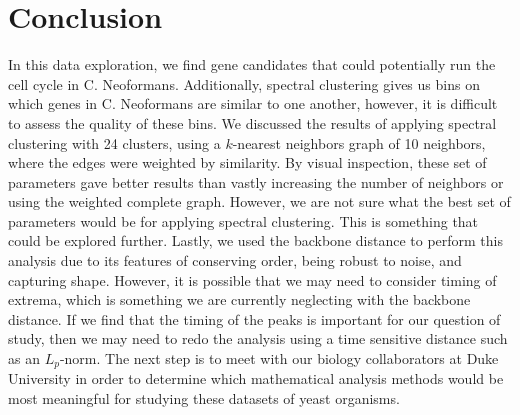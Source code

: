 \section{Conclusion}
In this data exploration, we find gene candidates that could potentially run the cell cycle in C. Neoformans. Additionally, spectral clustering gives us bins on which genes in C. Neoformans are similar to one another, however, it is difficult to assess the quality of these bins. We discussed the results of applying spectral clustering with 24 clusters, using a $k$-nearest neighbors graph of 10 neighbors, where the edges were weighted by similarity. By visual inspection, these set of parameters gave better results than vastly increasing the number of neighbors or using the weighted complete graph. However, we are not sure what the best set of parameters would be for applying spectral clustering. This is something that could be explored further. Lastly, we used the backbone distance to perform this analysis due to its features of conserving order, being robust to noise, and capturing shape. However, it is possible that we may need to consider timing of extrema, which is something we are currently neglecting with the backbone distance. If we find that the timing of the peaks is important for our question of study, then we may need to redo the analysis using a time sensitive distance such as an $L_p$-norm. The next step is to meet with our biology collaborators at Duke University in order to determine which mathematical analysis methods would be most meaningful for studying these datasets of yeast organisms.